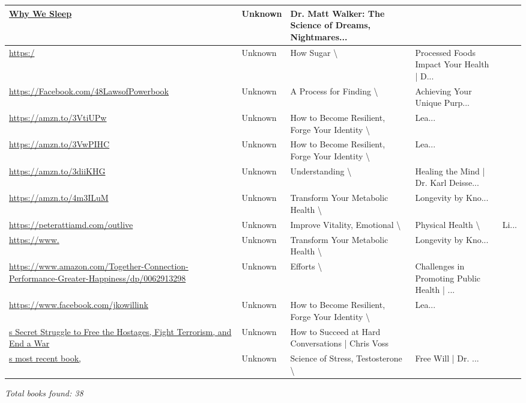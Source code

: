 \documentclass{article}
\begin{document}
\begin{longtable}{|p{6cm}|p{4cm}|p{4cm}|}
\hline
\href{https://amzn.to/4a9Tyyl}{Why We Sleep} & Unknown & Dr. Matt Walker: The Science of Dreams, Nightmares... \\
\hline
\href{https://amzn.to/48mNhOE}{https:/} & Unknown & How Sugar \textbackslash{}& Processed Foods Impact Your Health | D... \\
\hline
\href{https://amzn.to/3UnT3L6}{https://Facebook.com/48LawsofPowerbook} & Unknown & A Process for Finding \textbackslash{}& Achieving Your Unique Purp... \\
\hline
\href{https://amzn.to/3VtiUPw}{https://amzn.to/3VtiUPw} & Unknown & How to Become Resilient, Forge Your Identity \textbackslash{}& Lea... \\
\hline
\href{https://amzn.to/3VtiUPw}{https://amzn.to/3VwPIHC} & Unknown & How to Become Resilient, Forge Your Identity \textbackslash{}& Lea... \\
\hline
\href{https://amzn.to/3diiKHG}{https://amzn.to/3diiKHG} & Unknown & Understanding \textbackslash{}& Healing the Mind | Dr. Karl Deisse... \\
\hline
\href{https://amzn.to/4m3ILuM}{https://amzn.to/4m3ILuM} & Unknown & Transform Your Metabolic Health \textbackslash{}& Longevity by Kno... \\
\hline
\href{https://amzn.to/42nMx9H}{https://peterattiamd.com/outlive} & Unknown & Improve Vitality, Emotional \textbackslash{}& Physical Health \textbackslash{}& Li... \\
\hline
\href{https://amzn.to/4m3ILuM}{https://www.} & Unknown & Transform Your Metabolic Health \textbackslash{}& Longevity by Kno... \\
\hline
\href{https://www.amazon.com/Together-Connection-Performance-Greater-Happiness/dp/0062913298}{https://www.amazon.com/Together-Connection-Performance-Greater-Happiness/dp/0062913298} & Unknown & Efforts \textbackslash{}& Challenges in Promoting Public Health | ... \\
\hline
\href{https://amzn.to/46PnpcR}{https://www.facebook.com/jkowillink} & Unknown & How to Become Resilient, Forge Your Identity \textbackslash{}& Lea... \\
\hline
\href{https://amzn.to/3RfHTWv}{s Secret Struggle to Free the Hostages, Fight Terrorism, and End a War} & Unknown & How to Succeed at Hard Conversations | Chris Voss \\
\hline
\href{https://amzn.to/3yrZ6k7}{s most recent book,} & Unknown & Science of Stress, Testosterone \textbackslash{}& Free Will | Dr. ... \\
\hline
\end{longtable}

\textit{Total books found: 38}
\end{document}
